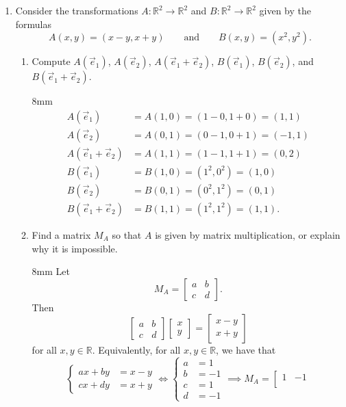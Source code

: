 \documentclass[letter]{article}
\newcommand{\R}{\mathbb{R}}
\newcommand{\mat}[1]{\begin{bmatrix}#1\end{bmatrix}}
\newenvironment{answer}{
	\begin{adjustwidth}{8mm}{} \vspace{2mm}}{\end{adjustwidth} \vspace{2mm}
}
\theoremstyle{plain}
\theoremstyle{definition}
\theoremstyle{remark}
\begin{document}
\begin{enumerate}
		\item Consider the transformations $A:\R^2\to \R^2$ and $B:\R^2\to \R^2$ given by
			the formulas
			\[
				A(x,y) = (x-y, x+y)\qquad\text{and}\qquad B(x,y)=(x^2,y^2).
			\]
			\begin{enumerate}
				\item Compute $A(\vec e_1)$, $A(\vec e_2)$, $A(\vec e_1+\vec e_2)$,
					$B(\vec e_1)$, $B(\vec e_2)$, and $B(\vec e_1+\vec e_2)$.
				\begin{answer}
					\begin{align*}
					A(\vec{e}_1) &= A(1,0) = (1-0, 1+0) = (1,1)\\
					A(\vec{e}_2) &= A(0,1) = (0-1, 0+1) = (-1,1)\\
					A(\vec{e}_1 + \vec{e}_2) &= A(1,1) = (1-1, 1+1) = (0,2)\\
					B(\vec{e}_1) &= B(1,0) = (1^2, 0^2) = (1,0)\\
					B(\vec{e}_2) &= B(0,1) = (0^2, 1^2) = (0,1)\\
					B(\vec{e}_1 + \vec{e}_2) &= B(1,1) = (1^2, 1^2) = (1,1).
					\end{align*}
				\end{answer}
				\item Find a matrix $M_A$ so that $A$ is given by matrix
					multiplication, or explain why it is impossible.
				\begin{answer}
					Let
					\[
					M_A = \left[\begin{array}{cc}							a & b\\
					c & d
					\end{array}\right]. 
					\]
					Then
					\[
					\left[\begin{array}{cc}									a & b\\
					c & d
					\end{array}\right]
					\mat{x\\y} = \mat{x-y\\x+y}
					\]
					for all $x, y \in \R$. Equivalently, for all $x, y \in \R$, we have that
					\[
					\begin{cases}
					ax+by &= x-y\\
					cx+dy &= x+y
					\end{cases} \iff
					\begin{cases}
					a &= 1\\
					b &= -1\\
					c &= 1\\
					d &= -1
					\end{cases}\implies
					M_A = \left[\begin{array}{cc}							1 & -1\\

\end{array}\]
\end{answer}
\end{enumerate}
\end{enumerate}
\end{document}
